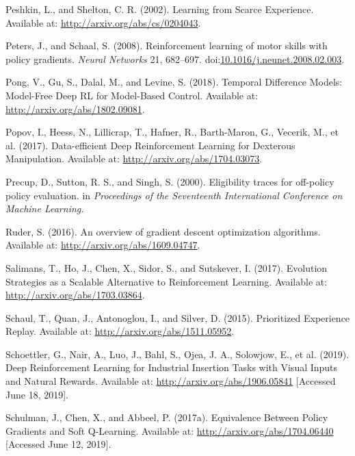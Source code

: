 \documentclass[
  letterpaper,
  DIV=11,
  numbers=noendperiod]{scrreprt}
\newlength{\cslhangindent}
\newlength{\cslentryspacingunit} %
\newenvironment{CSLReferences}[2] %
 {%
  \setlength{\parindent}{0pt}
  \ifodd #1
  \let\oldpar\par
  \def\par{\hangindent=\cslhangindent\oldpar}
  \fi
  \setlength{\parskip}{#2\cslentryspacingunit}
 }%
 {}
\begin{document}
\begin{CSLReferences}{1}{0}
\leavevmode{}%
Peshkin, L., and Shelton, C. R. (2002). Learning from {Scarce
Experience}. Available at: \url{http://arxiv.org/abs/cs/0204043}.

\leavevmode{}%
Peters, J., and Schaal, S. (2008). Reinforcement learning of motor
skills with policy gradients. \emph{Neural Networks} 21, 682--697.
doi:\href{https://doi.org/10.1016/j.neunet.2008.02.003}{10.1016/j.neunet.2008.02.003}.

\leavevmode{}%
Pong, V., Gu, S., Dalal, M., and Levine, S. (2018). Temporal {Difference
Models}: {Model-Free Deep RL} for {Model-Based Control}. Available at:
\url{http://arxiv.org/abs/1802.09081}.

\leavevmode{}%
Popov, I., Heess, N., Lillicrap, T., Hafner, R., Barth-Maron, G.,
Vecerik, M., et al. (2017). Data-efficient {Deep Reinforcement Learning}
for {Dexterous Manipulation}. Available at:
\url{http://arxiv.org/abs/1704.03073}.

\leavevmode{}%
Precup, D., Sutton, R. S., and Singh, S. (2000). Eligibility traces for
off-policy policy evaluation. in \emph{Proceedings of the {Seventeenth
International Conference} on {Machine Learning}.}

\leavevmode{}%
Ruder, S. (2016). An overview of gradient descent optimization
algorithms. Available at: \url{http://arxiv.org/abs/1609.04747}.

\leavevmode{}%
Salimans, T., Ho, J., Chen, X., Sidor, S., and Sutskever, I. (2017).
Evolution {Strategies} as a {Scalable Alternative} to {Reinforcement
Learning}. Available at: \url{http://arxiv.org/abs/1703.03864}.

\leavevmode{}%
Schaul, T., Quan, J., Antonoglou, I., and Silver, D. (2015). Prioritized
{Experience Replay}. Available at:
\url{http://arxiv.org/abs/1511.05952}.

\leavevmode{}%
Schoettler, G., Nair, A., Luo, J., Bahl, S., Ojea, J. A., Solowjow, E.,
et al. (2019). Deep {Reinforcement Learning} for {Industrial Insertion
Tasks} with {Visual Inputs} and {Natural Rewards}. Available at:
\url{http://arxiv.org/abs/1906.05841} {[}Accessed June 18, 2019{]}.

\leavevmode{}%
Schulman, J., Chen, X., and Abbeel, P. (2017a). Equivalence {Between
Policy Gradients} and {Soft Q-Learning}. Available at:
\url{http://arxiv.org/abs/1704.06440} {[}Accessed June 12, 2019{]}.


\end{CSLReferences}
\end{document}
